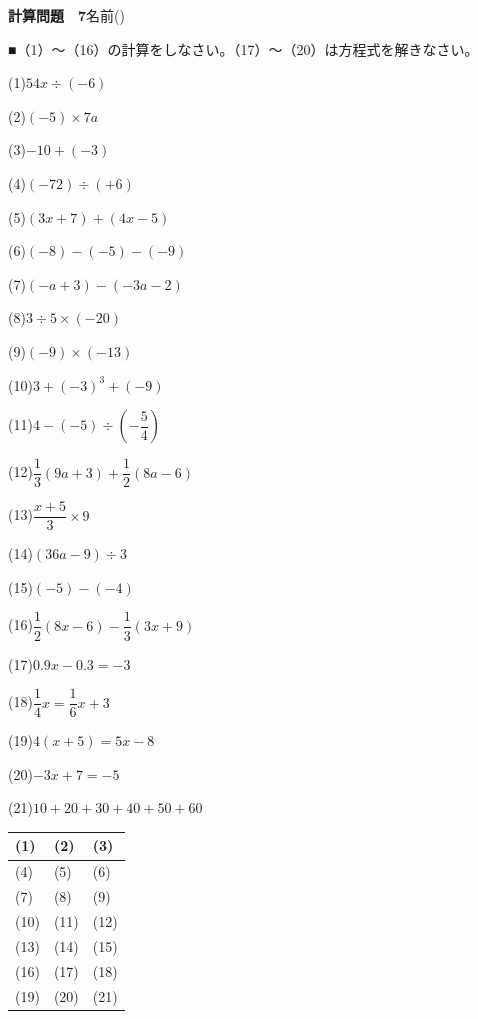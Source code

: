 \documentclass[a4paper,11pt]{ltjsarticle}
\newlength{\qcol}\setlength{\qcol}{0.47\textwidth}
\newlength{\qgap}
\newlength{\anscolw}\setlength{\anscolw}{0.30\textwidth}
\newlength{\ansh}
\newcommand{\Q}[2]{\parbox[t]{\qcol}{\raggedright (#1)\hspace{0.6em}$\displaystyle #2$}}
\newcommand{\QR}[4]{\Q{#1}{#2}\hfill\Q{#3}{#4}\par\vspace{\qgap}}
\newcommand{\anscell}[1]{\rule[-\ansdrop]{0pt}{\ansh}(#1)}
\newlength{\ansdrop}
\begin{document}
{\large\bfseries 計算問題　7}\hfill 名前(\underline{\hspace{32mm}})\par\vspace{3mm}
■（1）〜（16）の計算をしなさい。（17）〜（20）は方程式を解きなさい。\par\vspace{3mm}
\setlength{\qgap}{5.4mm}
\QR{1}{54x\div(-6)}{2}{(-5)\times7a}
\QR{3}{-10+(-3)}{4}{(-72)\div(+6)}
\QR{5}{(3x+7)+(4x-5)}{6}{(-8)-(-5)-(-9)}
\QR{7}{(-a+3)-(-3a-2)}{8}{3\div5\times(-20)}
\QR{9}{(-9)\times(-13)}{10}{3+(-3)^3+(-9)}
\QR{11}{4-(-5)\div\left(-\dfrac{5}{4}\right)}{12}{\dfrac{1}{3}(9a+3)+\dfrac{1}{2}(8a-6)}
\QR{13}{\dfrac{x+5}{3}\times9}{14}{(36a-9)\div3}
\QR{15}{(-5)-(-4)}{16}{\dfrac{1}{2}(8x-6)-\dfrac{1}{3}(3x+9)}
\QR{17}{0.9x-0.3=-3}{18}{\dfrac{1}{4}x=\dfrac{1}{6}x+3}
\QR{19}{4(x+5)=5x-8}{20}{-3x+7=-5}
\vspace{1mm}
\Q{21}{10+20+30+40+50+60}\par\vspace{3mm}
\setlength{\ansh}{9.5mm}\setlength{\ansdrop}{6mm}%
\begin{center}\begin{tabular}{|p{\anscolw}|p{\anscolw}|p{\anscolw}|}\hline
\anscell{1} & \anscell{2} & \anscell{3} \\\hline
\anscell{4} & \anscell{5} & \anscell{6} \\\hline
\anscell{7} & \anscell{8} & \anscell{9} \\\hline
\anscell{10} & \anscell{11} & \anscell{12} \\\hline
\anscell{13} & \anscell{14} & \anscell{15} \\\hline
\anscell{16} & \anscell{17} & \anscell{18} \\\hline
\anscell{19} & \anscell{20} & \anscell{21} \\\hline
\end{tabular}\end{center}
\end{document}
